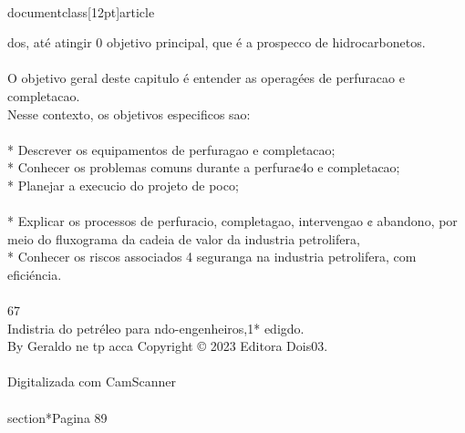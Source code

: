 \\documentclass[12pt]{article}
\begin{document}
{dos, até atingir 0 objetivo principal, que é a prospecco de hidrocarbonetos.\\
\\
O objetivo geral deste capitulo é entender as operagées de perfuracao e completacao.\\
Nesse contexto, os objetivos especificos sao:\\
\\
* Descrever os equipamentos de perfuragao e completacao;\\
* Conhecer os problemas comuns durante a perfura¢4o e completacao;\\
* Planejar a execucio do projeto de poco;\\
\\
* Explicar os processos de perfuracio, completagao, intervengao ¢ abandono, por\\
meio do fluxograma da cadeia de valor da industria petrolifera,\\
* Conhecer os riscos associados 4 seguranga na industria petrolifera, com eficiéncia.\\
\\
67\\
Indistria do petréleo para ndo-engenheiros,1* edigdo.\\
By Geraldo ne tp acca Copyright © 2023 Editora Dois03.\\
\\
Digitalizada com CamScanner\\

\\section*{Pagina 89}

}
\end{document}
